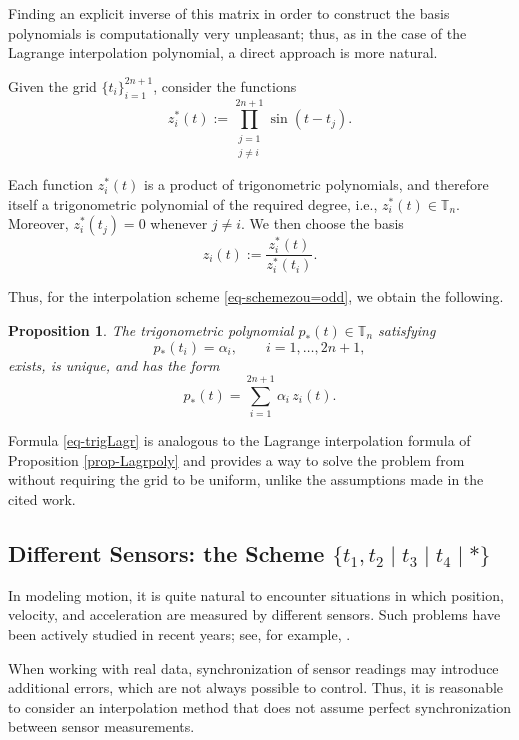 \documentclass{article}
\newtheorem{proposition}[theorem]{Proposition}	%
\theoremstyle{definition}
\theoremstyle{definition}
\numberwithin{figure}{section}
\newcommand{\1}{\mathbf{1}}
\begin{document}
Finding an explicit inverse of this matrix in order to construct the basis polynomials is computationally very unpleasant; thus, as in the case of the Lagrange interpolation polynomial, a direct approach is more natural.

Given the grid \(\{t_i\}_{i=1}^{2n+1}\), consider the functions
\begin{equation}
    z_i^*(t) := \prod_{\substack{j=1\\ j\neq i}}^{2n+1} \sin(t - t_j).
\end{equation}

Each function \(z_i^*(t)\) is a product of trigonometric polynomials, and therefore itself a trigonometric polynomial of the required degree, i.e., \(z_i^*(t) \in \mathbb{T}_n\). Moreover, \(z_i^*(t_j)=0\) whenever \(j\neq i\). We then choose the basis
\[
    z_i(t) := \frac{z_i^*(t)}{z_i^*(t_i)}.
\]

Thus, for the interpolation scheme \eqref{eq-schemezou=odd}, we obtain the following.

\begin{proposition}
    The trigonometric polynomial \(p_*(t)\in \mathbb{T}_n\) satisfying
    \[
        p_*(t_i) = \alpha_i,\qquad i = 1,\ldots, 2n+1,
    \]
    exists, is unique, and has the form
    \begin{equation}\label{eq-trigLagr}
        p_*(t) = \sum_{i=1}^{2n+1} \alpha_i\, z_i(t).
    \end{equation}
\end{proposition}

Formula \eqref{eq-trigLagr} is analogous to the Lagrange interpolation formula of Proposition \ref{prop-Lagrpoly} and provides a way to solve the problem from \cite{zou25triginterpol} without requiring the grid to be uniform, unlike the assumptions made in the cited work.

\subsection{Different Sensors: the Scheme \texorpdfstring{$\{t_1,t_2 \mid t_3 \mid t_4 \mid *\}$}{t1,t2 | t3 | t4 | *}}\label{sec-diffdatchyk}

In modeling motion, it is quite natural to encounter situations in which position, velocity, and acceleration are measured by different sensors. Such problems have been actively studied in recent years; see, for example, \cite{2024-ot,Diveev2025,MakarovMorozov2025}.

When working with real data, synchronization of sensor readings may introduce additional errors, which are not always possible to control. Thus, it is reasonable to consider an interpolation method that does not assume perfect synchronization between sensor measurements.
\end{document}
